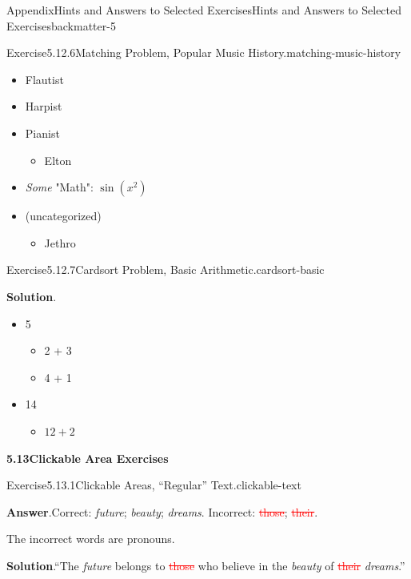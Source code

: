 \documentclass[oneside,10pt,]{book}
\newcommand{\blocktitlefont}{\relax}
\newcommand{\deletethick}{.25ex}
\newcommand{\deleted}[1]{\renewcommand{\ULthickness}{\deletethick}\textcolor{red}{\sout{#1}}}
\numberwithin{equation}{section}
\begin{document}
\begin{solutions-chapter}{Appendix}{Hints and Answers to Selected Exercises}{}{Hints and Answers to Selected Exercises}{}{}{backmatter-5}
\begin{divisionsolution}{Exercise}{5.12.6}{Matching Problem, Popular Music History.}{matching-music-history}
\begin{itemize}[label=\textbullet]
\begin{itemize}[label=$\circ$]
\end{itemize}
%
\item{}Flautist%
\item{}Harpist%
\item{}Pianist%
\begin{itemize}[label=$\circ$]
\item{}Elton%
\end{itemize}
%
\item{}\emph{Some} "Math": \(\sin(x^2)\)%
\item{}(uncategorized)%
\begin{itemize}[label=$\circ$]
\item{}Jethro%
\end{itemize}
%
\end{itemize}
%
\end{divisionsolution}%
\begin{divisionsolution}{Exercise}{5.12.7}{Cardsort Problem, Basic Arithmetic.}{cardsort-basic}%
\par\smallskip%
\noindent\textbf{\blocktitlefont Solution}.\hypertarget{cardsort-basic-4-back}{}\quad{}%
\begin{itemize}[label=\textbullet]
\item{}5%
\begin{itemize}[label=$\circ$]
\item{}2 + 3%
\item{}4 + 1%
\end{itemize}
%
\item{}14%
\begin{itemize}[label=$\circ$]
\item{}\(12 + 2\)%
\end{itemize}
%
\end{itemize}
%
\end{divisionsolution}%
\par\medskip
\noindent\textbf{\Large{}5.13\space\textperiodcentered\space{}Clickable Area Exercises}
\begin{divisionsolution}{Exercise}{5.13.1}{Clickable Areas, ``Regular'' Text.}{clickable-text}%
\par\smallskip%
\noindent\textbf{\blocktitlefont Answer}.\hypertarget{clickable-text-3-back}{}\quad{}Correct: \emph{future}; \emph{beauty}; \emph{dreams}. Incorrect: \deleted{those}; \deleted{their}.%
\par
The incorrect words are pronouns.%
\par\smallskip%
\noindent\textbf{\blocktitlefont Solution}.\hypertarget{clickable-text-4-back}{}\quad{}``The \emph{future} belongs to \deleted{those} who believe in the \emph{beauty} of \deleted{their} \emph{dreams}.''%

\end{divisionsolution}
\end{solutions-chapter}
\end{document}
